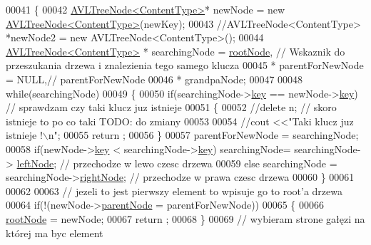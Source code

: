 \begin{DoxyCode}
00041         \{
00042         \hyperlink{class_a_v_l_tree_node}{AVLTreeNode<ContentType>}* newNode = \textcolor{keyword}{new} 
      \hyperlink{class_a_v_l_tree_node}{AVLTreeNode<ContentType>}(newKey);
00043                 \textcolor{comment}{//AVLTreeNode<ContentType>  *newNode2 = new AVLTreeNode<ContentType>();}
00044           \hyperlink{class_a_v_l_tree_node}{AVLTreeNode<ContentType>} * searchingNode = 
      \hyperlink{class_a_v_l_tree_aee3daa1b05e59d770a95e1274f09eb22}{rootNode},       \textcolor{comment}{// Wskaznik do przeszukania drzewa i znalezienia tego samego klucza}
00045                           * parentForNewNode = NULL,\textcolor{comment}{// parentForNewNode}
00046                           * grandpaNode;
00047 
00048           \textcolor{keywordflow}{while}(searchingNode)
00049           \{
00050             \textcolor{keywordflow}{if}(searchingNode->\hyperlink{class_a_v_l_tree_node_a717c2f6c33504a065570802e95189a57}{key} == newNode->\hyperlink{class_a_v_l_tree_node_a717c2f6c33504a065570802e95189a57}{key}) \textcolor{comment}{// sprawdzam czy taki klucz juz istnieje}
00051             \{
00052               \textcolor{comment}{//delete n; // skoro istnieje to po co taki TODO: do zmiany}
00053 
00054               \textcolor{comment}{//cout    <<"Taki klucz juz istnieje !\(\backslash\)n";}
00055               return ;
00056             \}
00057             parentForNewNode = searchingNode;
00058             \textcolor{keywordflow}{if}(newNode->\hyperlink{class_a_v_l_tree_node_a717c2f6c33504a065570802e95189a57}{key} < searchingNode->\hyperlink{class_a_v_l_tree_node_a717c2f6c33504a065570802e95189a57}{key}) searchingNode= searchingNode->
      \hyperlink{class_a_v_l_tree_node_afc53d4774f375c23795c9eb598f4d7cd}{leftNode}; \textcolor{comment}{// przechodze w lewo czesc drzewa}
00059             \textcolor{keywordflow}{else} searchingNode = searchingNode->\hyperlink{class_a_v_l_tree_node_a51dfb148f27625c89a3a153760517c38}{rightNode};                             \textcolor{comment}{//
       przechodze w prawa czesc drzewa}
00060           \}
00061 
00062 
00063           \textcolor{comment}{// jezeli to jest pierwszy element to wpisuje go to root'a drzewa}
00064           \textcolor{keywordflow}{if}(!(newNode->\hyperlink{class_a_v_l_tree_node_ae64d1261fea217d3e85928e7cf2a9151}{parentNode} = parentForNewNode))
00065           \{
00066             \hyperlink{class_a_v_l_tree_aee3daa1b05e59d770a95e1274f09eb22}{rootNode} = newNode;
00067             return ;
00068           \}
00069           \textcolor{comment}{// wybieram strone gałęzi na której ma byc element}

\end{DoxyCode}
